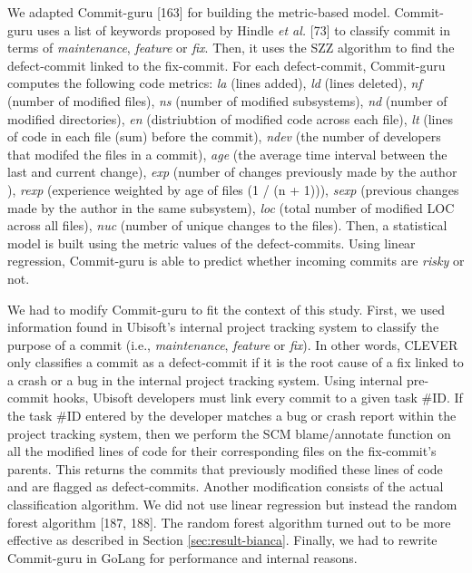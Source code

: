 \documentclass[12pt]{report}
\begin{document}
We adapted Commit-guru {[}163{]} for building the metric-based model.
Commit-guru uses a list of keywords proposed by Hindle \emph{et al.}
{[}73{]} to classify commit in terms of \emph{maintenance},
\emph{feature} or \emph{fix}. Then, it uses the SZZ algorithm to find
the defect-commit linked to the fix-commit. For each defect-commit,
Commit-guru computes the following code metrics: \emph{la} (lines
added), \emph{ld} (lines deleted), \emph{nf} (number of modified files),
\emph{ns} (number of modified subsystems), \emph{nd} (number of modified
directories), \emph{en} (distriubtion of modified code across each
file), \emph{lt} (lines of code in each file (sum) before the commit),
\emph{ndev} (the number of developers that modifed the files in a
commit), \emph{age} (the average time interval between the last and
current change), \emph{exp} (number of changes previously made by the
author ), \emph{rexp} (experience weighted by age of files (1 / (n +
1))), \emph{sexp} (previous changes made by the author in the same
subsystem), \emph{loc} (total number of modified LOC across all files),
\emph{nuc} (number of unique changes to the files). Then, a statistical
model is built using the metric values of the defect-commits. Using
linear regression, Commit-guru is able to predict whether incoming
commits are \emph{risky} or not.

We had to modify Commit-guru to fit the context of this study. First, we
used information found in Ubisoft's internal project tracking system to
classify the purpose of a commit (i.e., \emph{maintenance},
\emph{feature} or \emph{fix}). In other words, CLEVER only classifies a
commit as a defect-commit if it is the root cause of a fix linked to a
crash or a bug in the internal project tracking system. Using internal
pre-commit hooks, Ubisoft developers must link every commit to a given
task \#ID. If the task \#ID entered by the developer matches a bug or
crash report within the project tracking system, then we perform the SCM
blame/annotate function on all the modified lines of code for their
corresponding files on the fix-commit's parents. This returns the
commits that previously modified these lines of code and are flagged as
defect-commits. Another modification consists of the actual
classification algorithm. We did not use linear regression but instead
the random forest algorithm {[}187, 188{]}. The random forest algorithm
turned out to be more effective as described in Section
\ref{sec:result-bianca}. Finally, we had to rewrite Commit-guru in
GoLang for performance and internal reasons.
\end{document}
